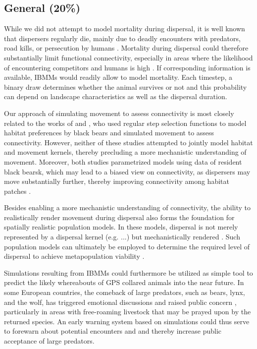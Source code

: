 \documentclass[abstract=on,10pt,a4paper,bibliography=totocnumbered]{article}
\begin{document}
\subsection{General (20\%)}
While we did not attempt to model mortality during dispersal, it is
well known that dispersers regularly die, mainly due to deadly encounters with
predators, road kills, or persecution by humans \citep{Woodroffe.2012,
Behr.2021b}. Mortality during dispersal could therefore substantially limit
functional connectivity, especially in areas where the likelihood of
encountering competitors and humans is high \citep{Cozzi.2020}. If corresponding
information is available, IBMMs would readily allow to model mortality. Each
timestep, a binary draw determines whether the animal survives or not and this
probability can depend on landscape characteristics as well as the dispersal
duration.

Our approach of simulating movement to assess connectivity is most closely
related to the works of \cite{Clark.2015} and \cite{Zeller.2020}, who used
regular step selection functions to model habitat preferences by black bears and
simulated movement to assess connectivity. However, neither of these studies
attempted to jointly model habitat and movement kernels, thereby precluding a
more mechanistic understanding of movement. Moreover, both studies parametrized
models using data of resident black bearsk, which may lead to a biased view on
connectivity, as dispersers may move substantially further, thereby improving
connectivity among habitat patches \citep{Elliot.2014}.

Besides enabling a more mechanistic understanding of connectivity, the ability
to realistically render movement during dispersal also forms the foundation for
spatially realistic population models. In these models, dispersal is not merely
represented by a dispersal kernel (e.g. ...) but mechanistically rendered
\citep{Revilla.2008}. Such population models can ultimately be employed to
determine the required level of dispersal to achieve metapopulation viability
\citep{DaviesMostert.2012}.

Simulations resulting from IBMMs could furthermore be utilized as simple tool to
predict the likely whereabouts of GPS collared animals into the near future. In
some European countries, the comeback of large predators, such as bears, lynx,
and the wolf, has triggered emotional discussions and raised public concern
\citep{Behr.2017}, particularly in areas with free-roaming livestock that may be
prayed upon by the returned species. An early warning system based on
simulations could thus serve to forewarn about potential encounters and and
thereby increase public acceptance of large predators.
\end{document}
